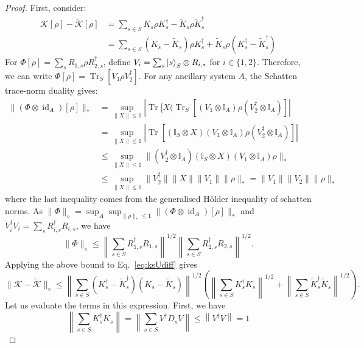 \documentclass[aps,floatfix,10pt,amssymb,amsfont,amsmath,superscriptaddress,float,nofootinbib,longbibliography,nobalancelastpage,twocolumn]{revtex4-2}
\begin{document}
\begin{proof}
First, consider:
\begin{align}
    \mathcal{K}[\rho] - \tilde{\mathcal{K}}[\rho] &= \sum_{s \in S} K_s\rho K_s^{\dagger} - \tilde K_s\rho \tilde K_s^{\dagger} \\
    &= \sum_{s \in S} (K_s-\tilde K_s)\rho K_s^{\dagger} +\tilde K_s\rho (K_s^{\dagger}- \tilde K_s^{\dagger}) \label{eq:ksUdiff}
\end{align}
For $\Phi[\rho]=\sum_sR_{1,s}\rho R_{2,s}^\dagger$, define $V_i=\sum_s\ket{s}_S\otimes R_{i,s}$ for $i \in \{1,2\}$. Therefore, we can write $\Phi[\rho] = \operatorname{Tr}_S[V_1\rho V_2^{\dagger}]$. For any ancillary system $A$, the Schatten trace-norm duality gives:
\begin{align}
    \|(\Phi\otimes\operatorname{id}_A)[\rho]\|_* &= \sup_{\|X\|\leq 1} | \operatorname{Tr}[X (\operatorname{Tr}_S[(V_1\otimes \mathbb{I}_A) \rho (V_2^{\dagger}\otimes \mathbb{I}_A)]|\\
    &=\sup_{\|X\|\leq 1} | \operatorname{Tr}[(\mathbb{I}_S \otimes X ) (V_1\otimes \mathbb{I}_A) \rho (V_2^{\dagger}\otimes \mathbb{I}_A)]|\\
    &\leq\sup_{\|X\|\leq 1} \| (V_2^{\dagger}\otimes \mathbb{I}_A)(\mathbb{I}_S \otimes X ) (V_1\otimes \mathbb{I}_A) \rho \|_*\\
    &\leq \sup_{\|X\|\leq 1} \| V_2^{\dagger}\|\|X\| \|V_1\| \| \rho \|_* = \|V_1\|\| V_2\| \| \rho \|_*
\end{align}
where the last inequality comes from the generalised H\"older inequality of schatten norms. As $\|\Phi\|_{\diamond} = \sup_A\sup_{\|\rho\|_*\leq 1}\|(\Phi\otimes\operatorname{id}_A)[\rho]\|_*$ and
\(V_i^\dagger V_i=\sum_sR_{i,s}^\dagger R_{i,s}\), we have
\begin{equation}
\|\Phi\|_\diamond
\leq
\left\|\sum_{s\in S}R_{1,s}^\dagger R_{1,s}\right\|^{1/2}
\left\|\sum_{s\in S}R_{2,s}^\dagger R_{2,s}\right\|^{1/2}.
\end{equation}
Applying the above bound to Eq.~\eqref{eq:ksUdiff}
gives
\begin{equation}
\|\mathcal{K}-\tilde{\mathcal{K}}\|_\diamond
\leq
\left\|\sum_{s\in S}(K_s^\dagger - \tilde K_s^\dagger)(K_s - \tilde K_s)\right\|^{1/2}
\left(
\left\|\sum_{s\in S}K_s^\dagger K_s\right\|^{1/2}
+
\left\|\sum_{s\in S}\tilde K_s^\dagger\tilde K_s\right\|^{1/2}
\right).
\label{eq:row-column-bound}
\end{equation}
Let us evaluate the terms in this expression. First, we have
\begin{equation}
     \left\|\sum_{s\in S} K_s^{\dagger}  K_s \right\| = \left\|\sum_{s\in S}  V^{\dagger}D_sV \right\| \leq  \left\|V^{\dagger} V\right\| = 1
\end{equation}


\end{proof}
\end{document}

